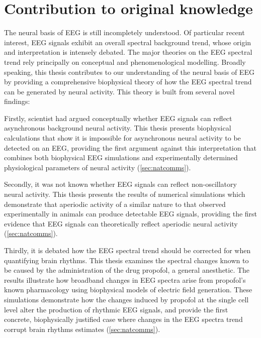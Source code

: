 \chapter*{Contribution to original knowledge}

The neural basis of EEG is still incompletely understood. Of particular recent interest, EEG signals exhibit an overall spectral background trend, whose origin and interpretation is intensely debated. The major theories on the EEG spectral trend rely principally on conceptual and phenomenological modelling. Broadly speaking, this thesis contributes to our understanding of the neural basis of EEG by providing a comprehensive biophysical theory of how the EEG spectral trend can be generated by neural activity. This theory is built from several novel findings:

Firstly, scientist had argued conceptually whether EEG signals can reflect asynchronous background neural activity. This thesis presents biophysical calculations that show it is impossible for asynchronous neural activity to be detected on an EEG, providing the first argument against this interpretation that combines both biophysical EEG simulations and experimentally determined physiological parameters of neural activity (\autoref{sec:natcomms}). 

Secondly, it was not known whether EEG signals can reflect non-oscillatory neural activity. This thesis presents the results of numerical simulations which demonstrate that aperiodic activity of a similar nature to that observed experimentally in animals can produce detectable EEG signals, providing the first evidence that EEG signals can theoretically reflect aperiodic neural activity (\autoref{sec:natcomms}).

Thirdly, it is debated how the EEG spectral trend should be corrected for when quantifying brain rhythms. This thesis examines the spectral changes known to be caused by the administration of the drug propofol, a general anesthetic. The results illustrate how broadband changes in EEG spectra arise from propofol's known pharmacology using biophysical models of electric field generation. These simulations demonstrate how the changes induced by propofol at the single cell level alter the production of rhythmic EEG signals, and provide the first concrete, biophysically justified case where changes in the EEG spectra trend corrupt brain rhythms estimates (\autoref{sec:natcomms}).

